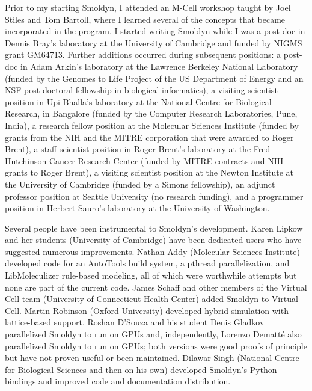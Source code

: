 \documentclass {scrbook}
\begin{document}
Prior to my starting Smoldyn, I attended an M-Cell workshop taught by Joel Stiles and Tom Bartoll, where I learned several of the concepts that became incorporated in the program. I started writing Smoldyn while I was a post-doc in Dennis Bray's laboratory at the University of Cambridge and funded by NIGMS grant GM64713. Further additions occurred during subsequent positions: a post-doc in Adam Arkin's laboratory at the Lawrence Berkeley National Laboratory (funded by the Genomes to Life Project of the US Department of Energy and an NSF post-doctoral fellowship in biological informatics), a visiting scientist position in Upi Bhalla's laboratory at the National Centre for Biological Research, in Bangalore (funded by the Computer Research Laboratories, Pune, India), a research fellow position at the Molecular Sciences Institute (funded by grants from the NIH and the MITRE corporation that were awarded to Roger Brent), a staff scientist position in Roger Brent's laboratory at the Fred Hutchinson Cancer Research Center (funded by MITRE contracts and NIH grants to Roger Brent), a visiting scientist position at the Newton Institute at the University of Cambridge (funded by a Simons fellowship), an adjunct professor position at Seattle University (no research funding), and a programmer position in Herbert Sauro's laboratory at the University of Washington.

Several people have been instrumental to Smoldyn's development. Karen Lipkow and her students (University of Cambridge) have been dedicated users who have suggested numerous improvements. Nathan Addy (Molecular Sciences Institute) developed code for an AutoTools build system, a pthread parallelization, and LibMoleculizer rule-based modeling, all of which were worthwhile attempts but none are part of the current code. James Schaff and other members of the Virtual Cell team (University of Connecticut Health Center) added Smoldyn to Virtual Cell. Martin Robinson (Oxford University) developed hybrid simulation with lattice-based support. Roshan D'Souza and his student Denis Gladkov parallelized Smoldyn to run on GPUs and, independently, Lorenzo Dematt\'{e} also parallelized Smoldyn to run on GPUs; both versions were good proofs of principle but have not proven useful or been maintained. Dilawar Singh (National Centre for Biological Sciences and then on his own) developed Smoldyn's Python bindings and improved code and documentation distribution.
\end{document}
